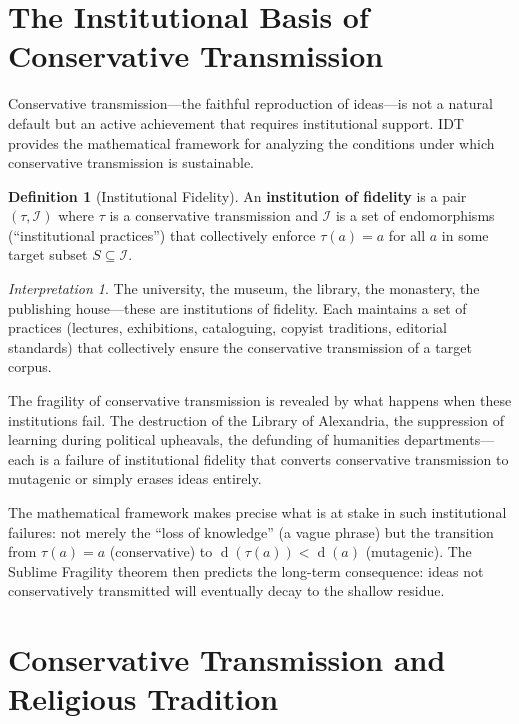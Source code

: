 \documentclass[11pt,openany]{book}
\theoremstyle{definition}
\newtheorem{definition}[axiom]{Definition}
\theoremstyle{plain}
\theoremstyle{remark}
\newtheorem{interpretation}[axiom]{Interpretation}
\newcommand{\IS}{\mathcal{I}}               %
\newcommand{\depth}{\operatorname{d}}       %
\newcommand{\transmit}{\tau}                 %
\begin{document}
\section{The Institutional Basis of Conservative Transmission}

Conservative transmission---the faithful reproduction of ideas---is not a natural default but an active achievement that requires institutional support. IDT provides the mathematical framework for analyzing the conditions under which conservative transmission is sustainable.

\begin{definition}[Institutional Fidelity]
An \textbf{institution of fidelity} is a pair $(\transmit, \mathcal{I})$ where $\transmit$ is a conservative transmission and $\mathcal{I}$ is a set of endomorphisms (``institutional practices'') that collectively enforce $\transmit(a) = a$ for all $a$ in some target subset $S \subseteq \IS$.
\end{definition}

\begin{interpretation}
The university, the museum, the library, the monastery, the publishing house---these are institutions of fidelity. Each maintains a set of practices (lectures, exhibitions, cataloguing, copyist traditions, editorial standards) that collectively ensure the conservative transmission of a target corpus.

The fragility of conservative transmission is revealed by what happens when these institutions fail. The destruction of the Library of Alexandria, the suppression of learning during political upheavals, the defunding of humanities departments---each is a failure of institutional fidelity that converts conservative transmission to mutagenic or simply erases ideas entirely.

The mathematical framework makes precise what is at stake in such institutional failures: not merely the ``loss of knowledge'' (a vague phrase) but the transition from $\transmit(a) = a$ (conservative) to $\depth(\transmit(a)) < \depth(a)$ (mutagenic). The Sublime Fragility theorem then predicts the long-term consequence: ideas not conservatively transmitted will eventually decay to the shallow residue.
\end{interpretation}

\section{Conservative Transmission and Religious Tradition}
\end{document}
